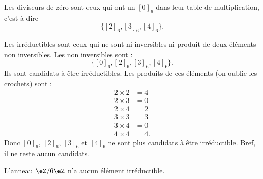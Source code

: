 \begin{normaltext}
	Les diviseurs de zéro sont ceux qui ont un \( [0]_6\) dans leur table de multiplication, c'est-à-dire
	\begin{equation}
		\big\{ [2]_6,[3]_6,[4]_6 \big\}.
	\end{equation}
\end{normaltext}

\begin{normaltext}[Irréductibles]
	Les irréductibles sont ceux qui ne sont ni inversibles ni produit de deux éléments non inversibles. Les non inversibles sont :
	\begin{equation}
		\big\{ [0]_6,[2]_6,[3]_6,[4]_6 \}.
	\end{equation}
	Ils sont candidats à être irréductibles. Les produits de ces éléments (on oublie les crochets) sont :
	\begin{subequations}
		\begin{align}
			2\times 2 & =4  \\
			2\times 3 & =0  \\
			2\times 4 & =2  \\
			3\times 3 & =3  \\
			3\times 4 & =0  \\
			4\times 4 & =4.
		\end{align}
	\end{subequations}
	Donc \( [0]_6\), \( [2]_6\), \( [3]_6\) et \( [4]_6\) ne sont plus candidats à être irréductible. Bref, il ne reste aucun candidats.

	L'anneau \( \eZ/6\eZ\) n'a aucun élément irréductible.
\end{normaltext}


